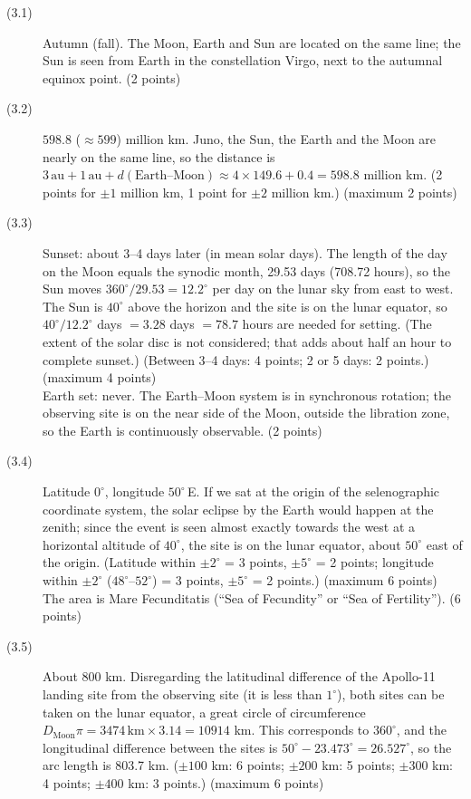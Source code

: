 \begin{description}
\item[(3.1)] Autumn (fall). The Moon, Earth and Sun are located on the same
  line; the Sun is seen from Earth in the constellation Virgo, next to the
  autumnal equinox point. \hfill(2 points)
\item[(3.2)] $598.8$ ($\approx 599$) million km. Juno, the Sun, the Earth
  and the Moon are nearly on the same line, so the distance is
  $3\,\mathrm{au} + 1\,\mathrm{au} + d(\mbox{Earth--Moon}) \approx
  4 \times 149.6 + 0.4 = 598.8$ million km.
  (2 points for $\pm 1$ million km, 1 point for $\pm 2$ million km.)
  \hfill(maximum 2 points)
\item[(3.3)] Sunset: about 3--4 days later (in mean solar days). The length
  of the day on the Moon equals the synodic month, 29.53 days (708.72
  hours), so the Sun moves $360^\circ/29.53 = 12.2^\circ$ per day on the
  lunar sky from east to west. The Sun is $40^\circ$ above the horizon and
  the site is on the lunar equator, so $40^\circ/12.2^\circ$ days
  $= 3.28$ days $= 78.7$ hours are needed for setting. (The extent of the
  solar disc is not considered; that adds about half an hour to complete
  sunset.) (Between 3--4 days: 4 points; 2 or 5 days: 2 points.)
  \hfill(maximum 4 points)\\
  Earth set: never. The Earth--Moon system is in synchronous rotation; the
  observing site is on the near side of the Moon, outside the libration
  zone, so the Earth is continuously observable. \hfill(2 points)
\item[(3.4)] Latitude $0^\circ$, longitude $50^\circ$\,E. If we sat at the
  origin of the selenographic coordinate system, the solar eclipse by the
  Earth would happen at the zenith; since the event is seen almost exactly
  towards the west at a horizontal altitude of $40^\circ$, the site is on
  the lunar equator, about $50^\circ$ east of the origin.
  (Latitude within $\pm 2^\circ$ = 3 points, $\pm 5^\circ$ = 2 points;
  longitude within $\pm 2^\circ$ ($48^\circ$--$52^\circ$) = 3 points,
  $\pm 5^\circ$ = 2 points.) \hfill(maximum 6 points)\\
  The area is Mare Fecunditatis (``Sea of Fecundity'' or ``Sea of
  Fertility''). \hfill(6 points)
\item[(3.5)] About 800 km. Disregarding the latitudinal difference of the
  Apollo-11 landing site from the observing site (it is less than
  $1^\circ$), both sites can be taken on the lunar equator, a great circle
  of circumference $D_{\mathrm{Moon}}\pi = 3474\,\mathrm{km} \times 3.14 =
  10914$ km. This corresponds to $360^\circ$, and the longitudinal
  difference between the sites is $50^\circ - 23.473^\circ = 26.527^\circ$,
  so the arc length is 803.7 km.
  ($\pm 100$ km: 6 points; $\pm 200$ km: 5 points; $\pm 300$ km: 4 points;
  $\pm 400$ km: 3 points.) \hfill(maximum 6 points)
\end{description}

